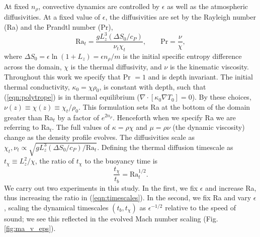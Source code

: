 \documentclass[aps, prfluids, onecolumn, notitlepage, nofootinbib, groupedaddress, amsfonts, amssymb, amsmath]{revtex4-1}
\newcommand{\grad}{\ensuremath{\nabla}}
\begin{document}
At fixed $n_\rho$, convective dynamics are 
controlled by $\epsilon$ as well as the atmospheric diffusivities.
At a fixed value of
$\epsilon$, the diffusivities are set by the
Rayleigh number (Ra) and the Prandtl number (Pr),
\begin{equation}
\text{Ra}_{t} = \frac{g L_z^3 (\Delta S_0 / c_P)}{\nu_t\chi_t},
\qquad
\text{Pr} = \frac{\nu}{\chi},
\end{equation}
where $\Delta S_0 = \epsilon\ln (1 + L_z) = \epsilon n_\rho / m$ 
is the initial specific entropy difference across the domain,
$\chi$ is the thermal diffusivity, 
and $\nu$ is the kinematic viscosity.
Throughout this work we specify
that Pr $= 1$ and is depth invariant.
The initial thermal
conductivity, $\kappa_0 = \chi \rho_0$, is
constant with depth, such that (\ref{eqn:polytrope}) is in
thermal equilibrium ($\grad\cdot[\kappa_0\grad T_0] = 0$).
By these
choices, $\nu(z) \equiv \chi(z) \equiv \chi_t / \rho_0$.
This formulation 
sets Ra at the bottom of the domain greater than
Ra$_t$ by a factor of $e^{2n_\rho}$. Henceforth
when we specify Ra we are referring to Ra$_t$.  
The full values of $\kappa = \rho\chi$ and 
$\mu = \rho\nu$ (the dynamic viscosity) change as the density 
profile evolves.  
The diffusivities scale as
$\chi_t, \nu_t \propto \sqrt{g L_z^3 (\Delta S_0 / c_P) / \text{Ra}_t}$.
Defining the thermal diffusion timescale as $t_\chi \equiv L_z^2 / \chi$, the
ratio of $t_\chi$ to the buoyancy time is
\begin{equation}
\frac{t_\chi}{t_b} =\text{Ra}_t^{1/2}.
\label{eqn:timescales}
\end{equation}
We carry out two experiments in this study. In the first,
we fix $\epsilon$ and increase Ra, thus increasing the ratio in
(\ref{eqn:timescales}). In the second, we fix Ra and vary $\epsilon$,
scaling the dynamical timescales $(t_b, t_\chi)$ as $\epsilon^{-1/2}$
relative to the speed of sound; we see this reflected in the evolved Mach
number scaling (Fig. \ref{fig:ma_v_eps}).
\end{document}
